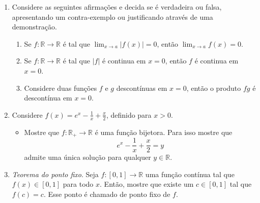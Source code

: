 \documentclass[latin,20pt]{article}
\begin{document}
\begin{enumerate}
    \item Considere as seguintes afirmações e decida se é verdadeira ou falsa, apresentando um contra-exemplo ou justificando através de uma demonstração.
      \begin{enumerate}
      \item Se $f:\mathbb{R}\rightarrow \mathbb{R}$
      é tal que $\lim_{x\rightarrow a} |f(x)|=0$, então $\lim_{x\rightarrow a}f(x)=0$.
      \item Se $f:\mathbb{R}\rightarrow \mathbb{R}$
      é tal que $|f|$ é continua em $x=0$, 
      então $f$ é continua em $x=0$. 
      \item Considere duas funções  $f$ e $g$ descontínuas em $x=0$, então o produto $fg$ é descontínua em $x=0$. 
      \end{enumerate}       
    \item Considere $f(x)=e^{x}-\frac{1}{x}+\frac{x}{2}$, definido para  
    $x>0$. 
      \begin{itemize}
      \item Mostre  que $f:\mathbb{R}_{+}\rightarrow \mathbb{R}$ é uma função bijetora.
    Para isso mostre que 
      $$e^{x}-\frac{1}{x}+\frac{x}{2}=y$$
      admite uma única solução para qualquer 
      $y \in \mathbb{R}$.
      \end{itemize}  
      \item {\it Teorema do ponto fixo}. Seja $f:[0,1] \rightarrow \mathbb{R}$ uma função contínua tal que $f(x) \in [0,1]$ para todo $x$.
      Então, mostre que existe um $c \in [0,1]$ tal que $f(c)=c$. 
      Esse ponto é chamado de ponto fixo de $f$. 
    \end{enumerate}
\end{document}
